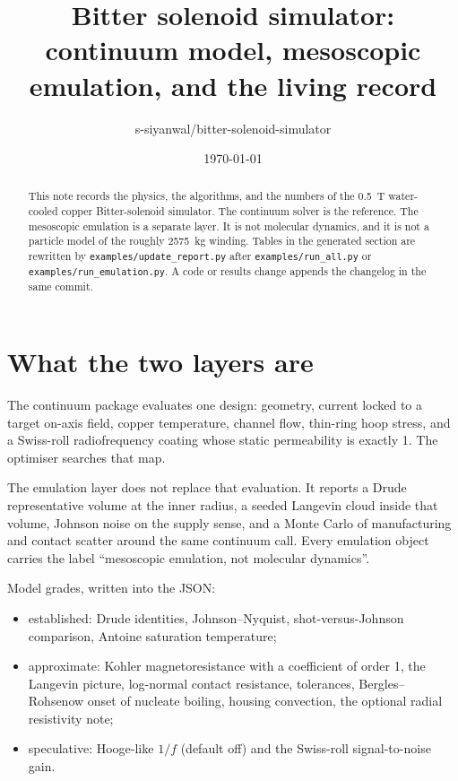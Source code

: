 \documentclass[11pt]{article}
\title{Bitter solenoid simulator:\\continuum model, mesoscopic emulation, and the living record}
\author{s-siyanwal/bitter-solenoid-simulator}
\date{\today}
\begin{document}
\maketitle

\begin{abstract}
This note records the physics, the algorithms, and the numbers of the 0.5~T water-cooled copper Bitter-solenoid simulator.
The continuum solver is the reference.
The mesoscopic emulation is a separate layer.
It is not molecular dynamics, and it is not a particle model of the roughly 2575~kg winding.
Tables in the generated section are rewritten by \texttt{examples/update\_report.py} after \texttt{examples/run\_all.py} or \texttt{examples/run\_emulation.py}.
A code or results change appends the changelog in the same commit.
\end{abstract}

\section{What the two layers are}

The continuum package evaluates one design: geometry, current locked to a target on-axis field, copper temperature, channel flow, thin-ring hoop stress, and a Swiss-roll radiofrequency coating whose static permeability is exactly 1.
The optimiser searches that map.

The emulation layer does not replace that evaluation.
It reports a Drude representative volume at the inner radius, a seeded Langevin cloud inside that volume, Johnson noise on the supply sense, and a Monte Carlo of manufacturing and contact scatter around the same continuum call.
Every emulation object carries the label ``mesoscopic emulation, not molecular dynamics''.

Model grades, written into the JSON:
\begin{itemize}
\item established: Drude identities, Johnson--Nyquist, shot-versus-Johnson comparison, Antoine saturation temperature;
\item approximate: Kohler magnetoresistance with a coefficient of order 1, the Langevin picture, log-normal contact resistance, tolerances, Bergles--Rohsenow onset of nucleate boiling, housing convection, the optional radial resistivity note;
\item speculative: Hooge-like $1/f$ (default off) and the Swiss-roll signal-to-noise gain.
\end{itemize}
\end{document}
